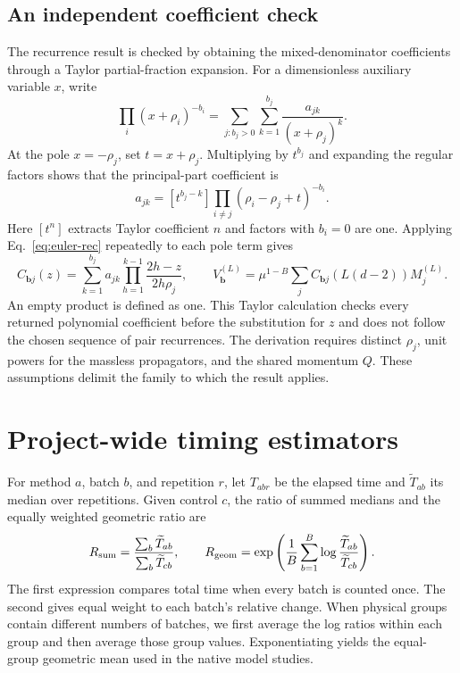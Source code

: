 \subsection{An independent coefficient check}
The recurrence result is checked by obtaining the mixed-denominator coefficients through a Taylor partial-fraction expansion. For a dimensionless auxiliary variable $x$, write
\begin{equation}
 \prod_i(x+\rho_i)^{-b_i}
   =\sum_{j:b_j>0}\sum_{k=1}^{b_j}\frac{a_{jk}}{(x+\rho_j)^k}.
\end{equation}
At the pole $x=-\rho_j$, set $t=x+\rho_j$. Multiplying by $t^{b_j}$ and expanding the regular factors shows that the principal-part coefficient is
\begin{equation}
 a_{jk}=[t^{b_j-k}]\prod_{i\ne j}(\rho_i-\rho_j+t)^{-b_i}.
 \label{eq:taylor}
\end{equation}
Here $[t^n]$ extracts Taylor coefficient $n$ and factors with $b_i=0$ are one. Applying Eq.~\eqref{eq:euler-rec} repeatedly to each pole term gives
\begin{equation}
 C_{\boldsymbol b j}(z)=\sum_{k=1}^{b_j}a_{jk}
       \prod_{h=1}^{k-1}\frac{2h-z}{2h\rho_j},
 \qquad
 V^{(L)}_{\boldsymbol b}
 =\mu^{1-B}\sum_j C_{\boldsymbol b j}(L(d-2))M_j^{(L)}.
 \label{eq:checked-vacuum}
\end{equation}
An empty product is defined as one. This Taylor calculation checks every returned polynomial coefficient before the substitution for $z$ and does not follow the chosen sequence of pair recurrences. The derivation requires distinct $\rho_j$, unit powers for the massless propagators, and the shared momentum $Q$. These assumptions delimit the family to which the result applies.

\section{Project-wide timing estimators}
\label{app:project-estimators}
For method $a$, batch $b$, and repetition $r$, let $T_{abr}$ be the elapsed time and $\widetilde T_{ab}$ its median over repetitions. Given control $c$, the ratio of summed medians and the equally weighted geometric ratio are
\begin{equation}
 R_{\rm sum}=\frac{\sum_b\widetilde T_{ab}}{\sum_b\widetilde T_{cb}},
 \qquad
 R_{\rm geom}=\exp\left(\frac{1}{B}\sum_{b=1}^{B}
       \log\frac{\widetilde T_{ab}}{\widetilde T_{cb}}\right).
\end{equation}
The first expression compares total time when every batch is counted once. The second gives equal weight to each batch's relative change. When physical groups contain different numbers of batches, we first average the log ratios within each group and then average those group values. Exponentiating yields the equal-group geometric mean used in the native model studies.

